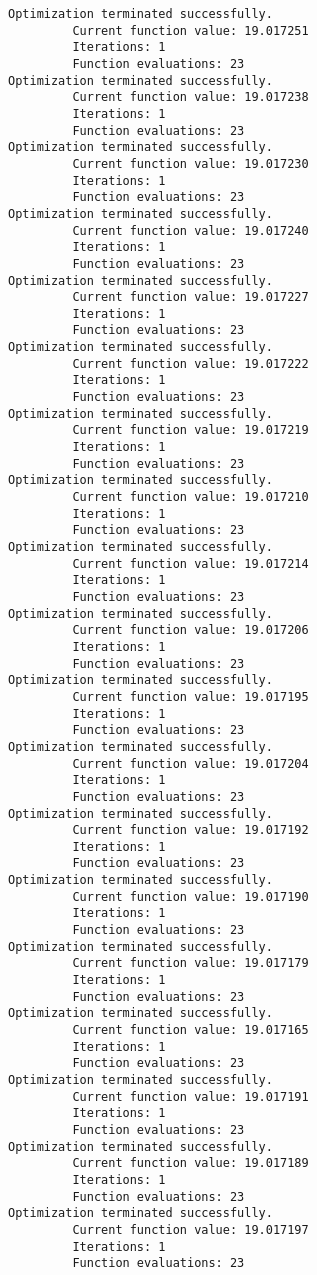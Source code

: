 \documentclass[11pt]{article}
\begin{document}
\begin{Verbatim}[commandchars=\\\{\}]
Optimization terminated successfully.
         Current function value: 19.017251
         Iterations: 1
         Function evaluations: 23
Optimization terminated successfully.
         Current function value: 19.017238
         Iterations: 1
         Function evaluations: 23
Optimization terminated successfully.
         Current function value: 19.017230
         Iterations: 1
         Function evaluations: 23
Optimization terminated successfully.
         Current function value: 19.017240
         Iterations: 1
         Function evaluations: 23
Optimization terminated successfully.
         Current function value: 19.017227
         Iterations: 1
         Function evaluations: 23
Optimization terminated successfully.
         Current function value: 19.017222
         Iterations: 1
         Function evaluations: 23
Optimization terminated successfully.
         Current function value: 19.017219
         Iterations: 1
         Function evaluations: 23
Optimization terminated successfully.
         Current function value: 19.017210
         Iterations: 1
         Function evaluations: 23
Optimization terminated successfully.
         Current function value: 19.017214
         Iterations: 1
         Function evaluations: 23
Optimization terminated successfully.
         Current function value: 19.017206
         Iterations: 1
         Function evaluations: 23
Optimization terminated successfully.
         Current function value: 19.017195
         Iterations: 1
         Function evaluations: 23
Optimization terminated successfully.
         Current function value: 19.017204
         Iterations: 1
         Function evaluations: 23
Optimization terminated successfully.
         Current function value: 19.017192
         Iterations: 1
         Function evaluations: 23
Optimization terminated successfully.
         Current function value: 19.017190
         Iterations: 1
         Function evaluations: 23
Optimization terminated successfully.
         Current function value: 19.017179
         Iterations: 1
         Function evaluations: 23
Optimization terminated successfully.
         Current function value: 19.017165
         Iterations: 1
         Function evaluations: 23
Optimization terminated successfully.
         Current function value: 19.017191
         Iterations: 1
         Function evaluations: 23
Optimization terminated successfully.
         Current function value: 19.017189
         Iterations: 1
         Function evaluations: 23
Optimization terminated successfully.
         Current function value: 19.017197
         Iterations: 1
         Function evaluations: 23

\end{Verbatim}
\end{document}
